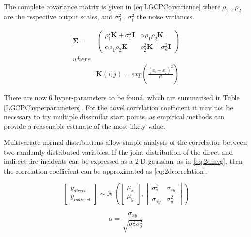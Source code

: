 \documentclass[a4paper,11pt]{report}
\begin{document}
The complete covariance matrix is given in \ref{eq:LGCPCcovariance} where \(\rho_1\) , \(\rho_2\) are the respective output scales, and \(\sigma_d^2\) , \(\sigma_i^2\) the noise variances.

\begin{equation} \label{eq:LGCPCcovariance}
\begin{aligned}
\boldsymbol{\Sigma} =&  \left( \begin{array}{cc}
\rho_1^2 \mathbf{K} + \sigma_i^2 \mathbf{I} & \alpha \rho_1 \rho_2 \mathbf{K}  \\
\alpha \rho_1 \rho_2 \mathbf{K} & \rho_2^2 \mathbf{K} + \sigma_d^2 \mathbf{I} \end{array} \right) \\ where\\
&\mathbf{K}(i,j) = exp\left( \frac{(x_i-x_j)^2}{l^2}\right)
\end{aligned}
\end{equation}

There are now 6 hyper-parameters to be found, which are summarised in Table \ref{LGCPChyperparameters}. For the novel correlation coefficient it may not be necessary to try multiple dissimilar start points, as empirical methods can provide a reasonable estimate of the most likely value.

Multivariate normal distributions allow simple analysis of the correlation between two randomly distributed variables. If the joint distribution of the direct and indirect fire incidents can be expressed as a 2-D gaussian, as in \ref{eq:2dmvg}, then the correlation coefficient can be approximated as \ref{eq:2dcorrelation}.

\begin{equation} \label{eq:2dmvg}
\left[ \begin{array}{cc}
y_{direct} \\
y_{indirect} \end{array} \right]
\sim
\mathcal{N} \left( \left[ \begin{array}{cc}
\mu_x \\
\mu_y \end{array} \right], \left[ \begin{array}{cc}
\sigma_{x}^2 & \sigma_{xy} \\
\sigma_{xy} & \sigma_{y}^2  \end{array} \right] \right)
\end{equation}

\begin{equation} \label{eq:2dcorrelation}
\alpha = \frac{\sigma_{xy}}{\sqrt{\sigma_{x}^2 \sigma_{y}^2}}
\end{equation}
\end{document}
